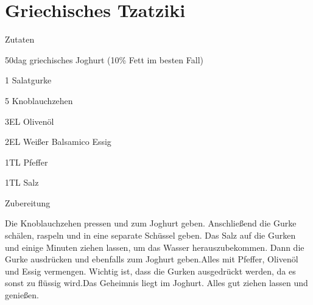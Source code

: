 \chapter*{Griechisches Tzatziki}
\begin{multicols}{2}
 {\Large Zutaten}
 \begin{Zutaten}
		\item 50dag griechisches Joghurt (10\% Fett im besten
		Fall)
		\item 1 Salatgurke
		\item 5 Knoblauchzehen
		\item 3EL Olivenöl
		\item 2EL Weißer Balsamico Essig
		\item 1TL Pfeffer
		\item 1TL Salz			
		
\end{Zutaten}
\columnbreak
\end{multicols}

{\Large Zubereitung} \newline
\begin{addmargin}[1cm]{0cm}
	Die Knoblauchzehen pressen und zum Joghurt geben. Anschließend die Gurke schälen, raspeln und in
	eine separate Schüssel geben. Das Salz auf die Gurken und einige Minuten ziehen lassen, um das
	Wasser herauszubekommen. Dann die Gurke ausdrücken und ebenfalls zum Joghurt geben.\newline Alles mit
	Pfeffer, Olivenöl und Essig vermengen.\newline
	Wichtig ist, dass die Gurken ausgedrückt werden, da es sonst zu flüssig wird.\newline Das Geheimnis liegt im
	Joghurt.\newline
	Alles gut ziehen lassen und genießen.
	
\end{addmargin}
